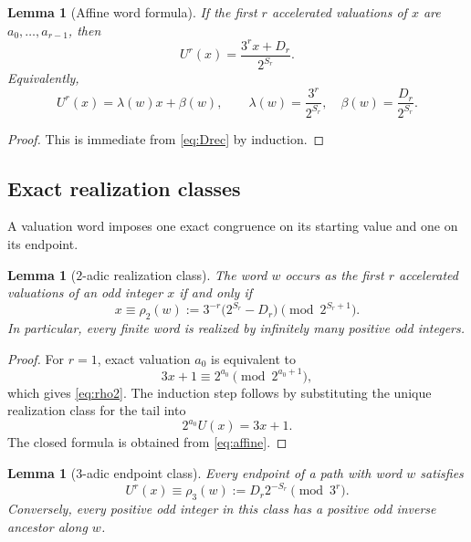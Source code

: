\documentclass[11pt,reqno]{amsart}
\numberwithin{equation}{section}
\newtheorem{lemma}[theorem]{Lemma}
\theoremstyle{definition}
\theoremstyle{remark}
\begin{document}
\begin{lemma}[Affine word formula]\label{lem:affine}
If the first $r$ accelerated valuations of $x$ are $a_0,\ldots,a_{r-1}$, then
\begin{equation}\label{eq:affine}
 U^r(x)=\frac{3^r x+D_r}{2^{S_r}}.
\end{equation}
Equivalently,
\[
 U^r(x)=\lambda(w)x+\beta(w),
 \qquad
 \lambda(w)=\frac{3^r}{2^{S_r}},
 \quad
 \beta(w)=\frac{D_r}{2^{S_r}}.
\]
\end{lemma}

\begin{proof}
This is immediate from \eqref{eq:Drec} by induction.
\end{proof}

\subsection{Exact realization classes}

A valuation word imposes one exact congruence on its starting value and one on its endpoint.

\begin{lemma}[$2$-adic realization class]\label{lem:rho2}
The word $w$ occurs as the first $r$ accelerated valuations of an odd integer $x$ if and only if
\begin{equation}\label{eq:rho2}
 x\equiv \rho_2(w)
 :=3^{-r}\bigl(2^{S_r}-D_r\bigr)
 \pmod{2^{S_r+1}}.
\end{equation}
In particular, every finite word is realized by infinitely many positive odd integers.
\end{lemma}

\begin{proof}
For $r=1$, exact valuation $a_0$ is equivalent to
\[
 3x+1\equiv2^{a_0}\pmod{2^{a_0+1}},
\]
which gives \eqref{eq:rho2}.  The induction step follows by substituting the unique realization class for the tail into
\[
 2^{a_0}U(x)=3x+1.
\]
The closed formula is obtained from \eqref{eq:affine}.
\end{proof}

\begin{lemma}[$3$-adic endpoint class]\label{lem:rho3}
Every endpoint of a path with word $w$ satisfies
\begin{equation}\label{eq:rho3}
 U^r(x)\equiv \rho_3(w)
 :=D_r2^{-S_r}
 \pmod{3^r}.
\end{equation}
Conversely, every positive odd integer in this class has a positive odd inverse ancestor along $w$.
\end{lemma}
\end{document}
